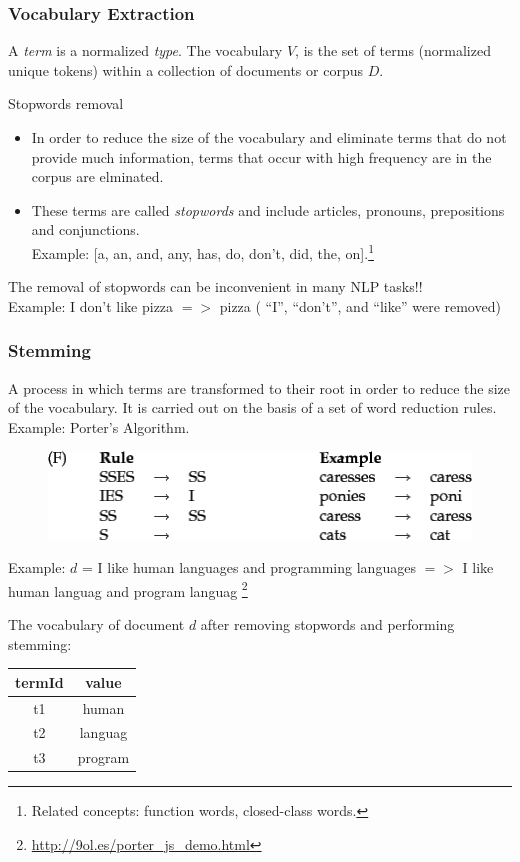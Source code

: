\documentclass[handout]{beamer}
\begin{document}
\begin{frame}\frametitle{Vocabulary Extraction }
\footnotesize{
A  \emph{term} is a normalized \emph{type}. The vocabulary $V$, is the set of terms (normalized unique tokens) within a collection of documents or corpus $D$.
 
\begin{block}{Stopwords removal}
\begin{itemize}
 \item In order to reduce the size of the vocabulary and eliminate terms that do not provide much information, terms that occur with high frequency are in the corpus are elminated. 
 \item These terms are called \emph{stopwords} and include  articles, pronouns, prepositions and conjunctions. \\
Example: [a, an, and, any, has, do, don't, did, the, on].\footnote{Related concepts: function words, closed-class words.}
\end{itemize}

The removal of stopwords can be inconvenient in many NLP tasks!! 
\\ Example: I don't like pizza $=>$ pizza  ( ``I'', ``don't'', and ``like'' were removed)

\end{block}


}
 
\end{frame}


\begin{frame}\frametitle{Stemming}
\footnotesize{
A process in which terms are transformed to their root in order to reduce the size of the vocabulary. It is carried out on the basis of a set of word reduction rules. \\ Example: Porter's Algorithm.

\begin{figure}[h!]
	\centering
	\includegraphics[scale=0.45]{pics/porter.png}
\end{figure}

 Example: $d$ = I like human languages and programming languages $=>$
I like human languag and program languag \footnote{\url{http://9ol.es/porter_js_demo.html}}

The vocabulary of document $d$ after removing stopwords and performing stemming:


\begin{table}
\centering
\begin{tabular}{c|c}
\hline
termId & value \\ 
\hline
t1 & human \\ 
t2 & languag \\ 
t3 & program\\ 
\hline
\end{tabular}
\end{table}

}
 
\end{frame}
\end{document}
